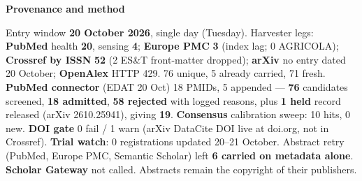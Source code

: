 \documentclass[10pt]{article}
\begin{document}


\vspace{2mm}

\begin{keybox}
{\sffamily\bfseries\footnotesize\color{Deep}Provenance and method}\\[1.2mm]
{\fontsize{7.2}{8.8}\selectfont
Entry window \textbf{20 October 2026}, single day (Tuesday). Harvester legs: \textbf{PubMed} health
\textbf{20}, sensing \textbf{4}; \textbf{Europe PMC} \textbf{3} (index lag; 0 AGRICOLA); \textbf{Crossref by ISSN}
\textbf{52} (2 ES\&T front-matter dropped); \textbf{arXiv} no entry dated 20 October; \textbf{OpenAlex} HTTP 429.
76 unique, 5 already carried, 71 fresh. \textbf{PubMed connector} (EDAT 20 Oct) 18 PMIDs, 5 appended ---
\textbf{76} candidates screened, \textbf{18 admitted}, \textbf{58 rejected} with logged reasons, plus \textbf{1 held}
record released (arXiv 2610.25941), giving \textbf{19}. \textbf{Consensus} calibration sweep: 10 hits, 0 new.
\textbf{DOI gate} 0 fail / 1 warn (arXiv DataCite DOI live at doi.org, not in Crossref). \textbf{Trial watch}:
0 registrations updated 20--21 October. Abstract retry (PubMed, Europe PMC, Semantic Scholar) left
\textbf{6 carried on metadata alone}. \textbf{Scholar Gateway} not called. Abstracts remain the copyright of their
publishers.\par}
\end{keybox}
\end{document}
